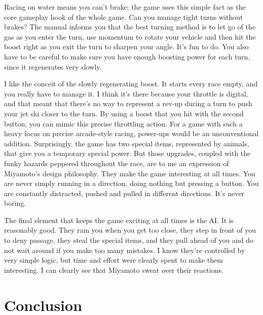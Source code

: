 \documentclass{book}
\begin{document}
Racing on water means you can’t brake; the game uses this simple fact as the core gameplay hook of the whole game. Can you manage tight turns without brakes? The manual informs you that the best turning method is to let go of the gas as you enter the turn, use momentum to rotate your vehicle and then hit the boost right as you exit the turn to sharpen your angle. It’s fun to do. You also have to be careful to make sure you have enough boosting power for each turn, since it regenerates very slowly.\par
\FloatBarrier\vspace{\baselineskip}\begin{figure}[H]\end{figure}
I like the conceit of the slowly regenerating boost. It starts every race empty, and you really have to manage it. I think it’s there because your throttle is digital, and that meant that there’s no way to represent a rev-up during a turn to push your jet ski closer to the turn. By using a boost that you hit with the second button, you can mimic this precise throttling action. For a game with such a heavy focus on precise arcade-style racing, power-ups would be an unconventional addition. Surprisingly, the game has two special items, represented by animals, that give you a temporary special power. But those upgrades, coupled with the funky hazards peppered throughout the race, are to me an expression of Miyamoto’s design philosophy. They make the game interesting at all times. You are never simply running in a direction, doing nothing but pressing a button. You are constantly distracted, pushed and pulled in different directions. It’s never boring.\par
The final element that keeps the game exciting at all times is the AI. It is reasonably good. They ram you when you get too close, they step in front of you to deny passage, they steal the special items, and they pull ahead of you and do not wait around if you make too many mistakes. I know they’re controlled by very simple logic, but time and effort were clearly spent to make them interesting. I can clearly see that Miyamoto sweat over their reactions.\par
\FloatBarrier\section*{Conclusion}
\end{document}
